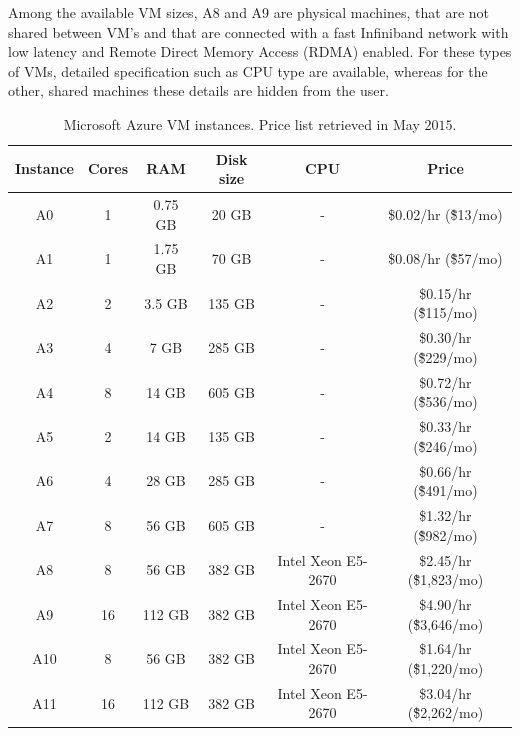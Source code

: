 \documentclass[3p,times]{elsarticle}
\begin{document}
Among the available VM sizes, A8 and A9 are physical machines, that are not shared between VM's and that are connected with a fast Infiniband network with low latency and Remote Direct Memory Access (RDMA) enabled. For these types of VMs, detailed specification such as CPU type are available, whereas for the other, shared machines these details are hidden from the user.
 

	\begin{center}
	\begin{table}
				\begin{tabular}{|c|c|c|c|c|c|}
			\hline
			Instance & Cores & RAM     & Disk size & CPU & Price                    \\ \hline
				A0     & 1     & 0.75 GB & 20 GB      & - & \$0.02/hr (\~\$13/mo)    \\ \hline
				A1     & 1     & 1.75 GB & 70 GB      & - & \$0.08/hr (\~\$57/mo)    \\ \hline
				A2     & 2     & 3.5 GB  & 135 GB     & - & \$0.15/hr (\~\$115/mo)   \\ \hline
				A3     & 4     & 7 GB    & 285 GB     & - & \$0.30/hr (\~\$229/mo)   \\ \hline
				A4     & 8     & 14 GB   & 605 GB     & - & \$0.72/hr (\~\$536/mo)   \\ \hline
				A5     & 2     & 14 GB   & 135 GB     & - & \$0.33/hr (\~\$246/mo)   \\ \hline
				A6     & 4     & 28 GB   & 285 GB     & - & \$0.66/hr (\~\$491/mo)   \\ \hline
				A7     & 8     & 56 GB   & 605 GB     & - & \$1.32/hr (\~\$982/mo)  \\ \hline
				A8     & 8     & 56 GB   & 382 GB     & Intel Xeon E5-2670 & \$2.45/hr (\~\$1,823/mo) \\ \hline
				A9     & 16    & 112 GB  & 382 GB     & Intel Xeon E5-2670 & \$4.90/hr (\~\$3,646/mo) \\ \hline
				A10    & 8     & 56 GB   & 382 GB     & Intel Xeon E5-2670 & \$1.64/hr (\~\$1,220/mo) \\ \hline
				A11    & 16    & 112 GB  & 382 GB     & Intel Xeon E5-2670 & \$3.04/hr (\~\$2,262/mo) \\ \hline
			\end{tabular}		
			\caption{Microsoft Azure VM instances. Price list retrieved in May $2015$.}
			\label{tab:azureVMs}	

			
	\end{table}
\end{center}
 
\end{document}
